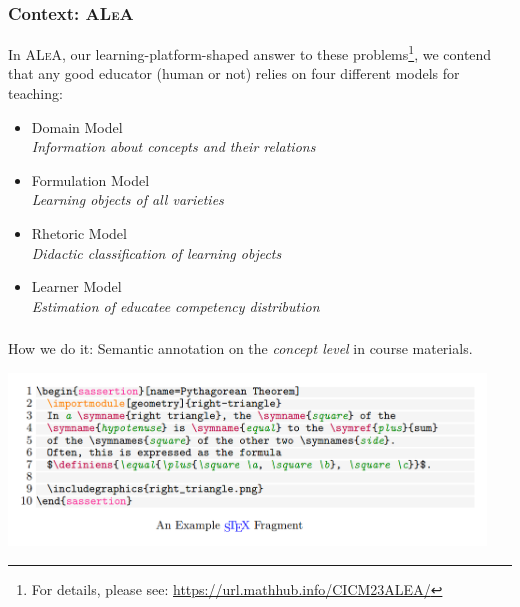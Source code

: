 \documentclass[aspectratio=169, usenames, dvipsnames]{beamer}
\def\ALeA{\textsc{ALeA}\xspace}
\begin{document}
\begin{frame}[fragile]
\frametitle{Context: \ALeA}

In \ALeA, our learning-platform-shaped answer to these problems\footnote{For details, please see: \url{https://url.mathhub.info/CICM23ALEA/}}, we contend that any good educator (human or not) relies on four different models for teaching:
\bigskip

\begin{minipage}{0.4\textwidth}
\end{minipage}%
\begin{minipage}{0.6\textwidth}
\begin{itemize}
\pause
\item Domain Model\\
\emph{Information about concepts and their relations}
\pause
\item Formulation Model\\
\emph{Learning objects of all varieties}
\pause
\item Rhetoric Model\\
\emph{Didactic classification of learning objects}
\pause
\item Learner Model\\
\emph{Estimation of educatee competency distribution}
\end{itemize}
\end{minipage}%
\end{frame}

\begin{frame}
\frametitle{\sTeX}
\begin{center}
How we do it: Semantic annotation on the \emph{concept level} in course materials.\bigskip

\includegraphics[width=0.95\textwidth, keepaspectratio]{images/stex_example.png} 
\end{center}
\end{frame}
\end{document}
